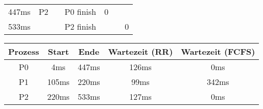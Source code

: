 \begin{frame}
\begin{table}[]
\begin{adjustbox}{width=0.8\textwidth}
\begin{tabular}{c|ccc|ccc}
                447ms                                   & P2                                              &                 & P0 finish            & \alert{0}                       &             &             \\
                533ms                                   &                                                 &                 & P2 finish            &                                 &             & \alert{0}
            \end{tabular}
        \end{adjustbox}
    \end{table}

    \pause

    \begin{table}[]
        \begin{tabular}{c|c|c|c|c}
            \textbf{Prozess} & \textbf{Start} & \textbf{Ende} & \textbf{Wartezeit (RR)} & \textbf{Wartezeit (FCFS)} \\
            \hline
            P0               & 4ms            & 447ms         & 126ms                   & 0ms                       \\
            P1               & 105ms          & 220ms         & 99ms                    & 342ms                     \\
            P2               & 220ms          & 533ms         & 127ms                   & 0ms
        \end{tabular}
    \end{table}

\end{frame}
